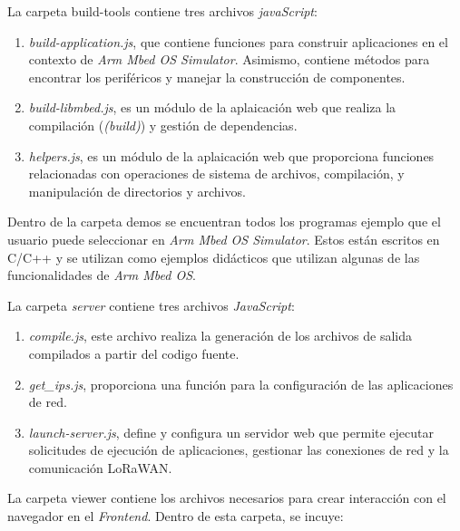 La carpeta \textquotedbl build-tools\textquotedbl{} contiene tres archivos \textit{javaScript}: 

\begin{enumerate}
    \item \textit{build-application.js}, que contiene funciones para construir aplicaciones en el contexto de \textit{Arm Mbed OS Simulator}. Asimismo, contiene métodos para encontrar los periféricos y manejar la construcción de componentes.
	
    \item \textit{build-libmbed.js}, es un módulo de la aplaicación web que realiza la compilación (\textit{(build)}) y gestión de dependencias.

    \item \textit{helpers.js}, es un módulo de la aplaicación web que proporciona funciones relacionadas con operaciones de sistema de archivos, compilación, y manipulación de directorios y archivos.
\end{enumerate}
 
Dentro de la carpeta \textquotedbl demos\textquotedbl{} se encuentran todos los programas ejemplo que el usuario puede seleccionar en \textit{Arm Mbed OS Simulator}. Estos están escritos en C/C++ y se utilizan como ejemplos didácticos que utilizan algunas de las funcionalidades de \textit{Arm Mbed OS}.
 
La carpeta \textquotedbl \textit{server}\textquotedbl{} contiene tres archivos \textit{JavaScript}: 

\begin{enumerate}
    \item \textit{compile.js}, este archivo realiza la generación de los archivos de salida compilados a partir del codigo fuente.

    \item \textit{get\_ips.js}, proporciona una función para la configuración de las aplicaciones de red.

    \item \textit{launch-server.js}, define y configura un servidor web que permite ejecutar solicitudes de ejecución de aplicaciones, gestionar las conexiones de red y la comunicación LoRaWAN.	
\end{enumerate}
 
La carpeta \textquotedbl viewer\textquotedbl{} contiene los archivos necesarios para crear interacción con el navegador en el \textit{Frontend}. Dentro de esta carpeta, se incuye:

